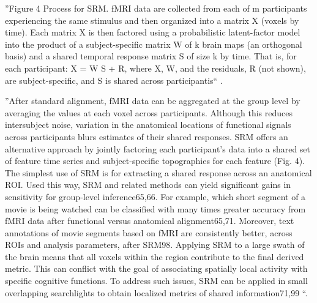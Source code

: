 ''Figure 4 Process for SRM. fMRI data are collected from each of m participants
experiencing the same stimulus and then organized into a matrix X (voxels by
time). Each matrix X is then factored using a probabilistic latent-factor model
into the product of a subject-specific matrix W of k brain maps (an orthogonal
basis) and a shared temporal response matrix S of size k by time. That is, for
each participant: X = W S + R, where X, W, and the residuals, R (not shown), are
subject-specific, and S is shared across participantis``
\citep{cohen2017computational}.

''After standard alignment, fMRI data can be aggregated at the group level by
averaging the values at each voxel across participants.
%
Although this reduces intersubject noise, variation in the anatomical locations
of functional signals across participants blurs estimates of their shared
responses.
%
SRM offers an alternative approach by jointly factoring each participant’s data
into a shared set of feature time series and subject-specific topographies for
each feature (Fig. 4).
%
The simplest use of SRM is for extracting a shared response across an anatomical
ROI. Used this way, SRM and related methods can yield significant gains in
sensitivity for group-level inference65,66.
%
For example, which short segment of a movie is being watched can be classified
with many times greater accuracy from fMRI data after functional versus
anatomical alignment65,71.
%
Moreover, text annotations of movie segments based on fMRI are consistently
better, across ROIs and analysis parameters, after SRM98.
%
Applying SRM to a large swath of the brain means that all voxels within the
region contribute to the final derived metric.
%
This can conflict with the goal of associating spatially local activity with
specific cognitive functions. To address such issues, SRM can be applied in
small overlapping searchlights to obtain localized metrics of shared
information71,99 \citep{cohen2017computational}``.

